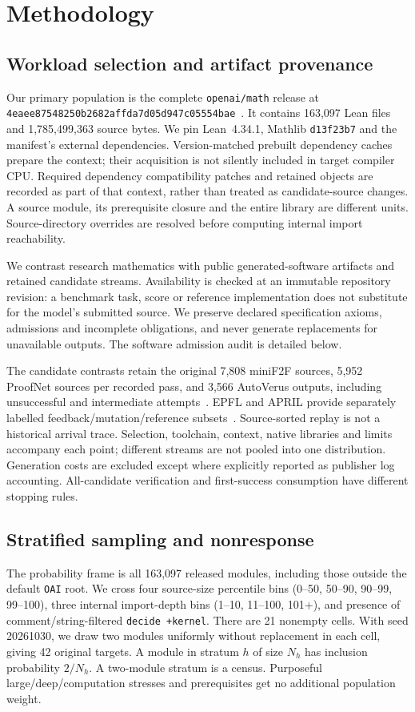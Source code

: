 \documentclass[10pt,twocolumn]{article}
\begin{document}
\section{Methodology}\label{sec:method}
\subsection{Workload selection and artifact provenance}
Our primary population is the complete \texttt{openai/math} release at
\texttt{4eaee87548250b2682affda7d05d947c05554bae}~\cite{openaiMathSource}.
It contains 163,097 Lean files and 1,785,499,363 source bytes.
We pin Lean~4.34.1, Mathlib \texttt{d13f23b7} and the manifest's external
dependencies. Version-matched prebuilt dependency caches prepare the
context; their acquisition is not silently included in target compiler CPU.
Required dependency compatibility patches and retained objects are recorded
as part of that context, rather than treated as candidate-source changes.
A source module, its prerequisite closure and the entire library are
different units. Source-directory overrides are resolved before computing
internal import reachability.

We contrast research mathematics with public generated-software artifacts
and retained candidate streams. Availability is checked at an immutable
repository revision: a benchmark task, score or reference implementation
does not substitute for the model's submitted source.
We preserve declared specification axioms, admissions and incomplete
obligations, and never generate replacements for unavailable outputs.
The software admission audit is detailed below.

The candidate contrasts retain the original 7,808 miniF2F sources,
5,952 ProofNet sources per recorded pass, and 3,566 AutoVerus outputs,
including unsuccessful and intermediate attempts~\cite{autoverusArtifact}.
EPFL and APRIL provide separately labelled feedback/mutation/reference
subsets~\cite{epflEvaluation,aprilDataset}.
Source-sorted replay is not a historical arrival trace. Selection,
toolchain, context, native libraries and limits accompany each point;
different streams are not pooled into one distribution.
Generation costs are excluded except where explicitly reported as
publisher log accounting. All-candidate verification and first-success
consumption have different stopping rules.

\subsection{Stratified sampling and nonresponse}
The probability frame is all 163,097 released modules, including those
outside the default \texttt{OAI} root.
We cross four source-size percentile bins (0--50, 50--90, 90--99, 99--100),
three internal import-depth bins (1--10, 11--100, 101+), and presence of
comment/string-filtered \texttt{decide +kernel}.
There are 21 nonempty cells. With seed 20261030, we draw two modules
uniformly without replacement in each cell, giving 42 original targets.
A module in stratum $h$ of size $N_h$ has inclusion probability $2/N_h$.
A two-module stratum is a census. Purposeful large/deep/computation stresses
and prerequisites get no additional population weight.
\end{document}
